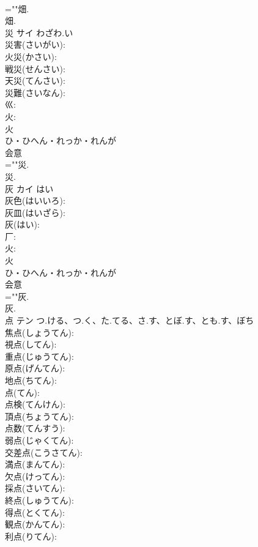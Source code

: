 \documentclass[8pt]{extreport}
\begin{document}
\begin{CJK}{UTF8}{min}
\\	=""畑.
\\	畑.
\\	災	サイ	わざわ.い		
\\	災害(さいがい): 
\\	火災(かさい): 
\\	戦災(せんさい): 
\\	天災(てんさい): 
\\	災難(さいなん): 
\\	巛: 
\\	火: 
\\	火	
\\	ひ・ひへん・れっか・れんが	
\\	会意 
\\	=""災.
\\	災.
\\	灰	カイ	はい		
\\	灰色(はいいろ): 
\\	灰皿(はいざら): 
\\	灰(はい): 
\\	厂: 
\\	火: 
\\	火	
\\	ひ・ひへん・れっか・れんが	
\\	会意 
\\	=""灰.
\\	灰.
\\	点	テン	つ.ける、つ.く、た.てる、さ.す、とぼ.す、とも.す、ぼち		
\\	焦点(しょうてん): 
\\	視点(してん): 
\\	重点(じゅうてん): 
\\	原点(げんてん): 
\\	地点(ちてん): 
\\	点(てん): 
\\	点検(てんけん): 
\\	頂点(ちょうてん): 
\\	点数(てんすう): 
\\	弱点(じゃくてん): 
\\	交差点(こうさてん): 
\\	満点(まんてん): 
\\	欠点(けってん): 
\\	採点(さいてん): 
\\	終点(しゅうてん): 
\\	得点(とくてん): 
\\	観点(かんてん): 
\\	利点(りてん): 

\end{CJK}
\end{document}
